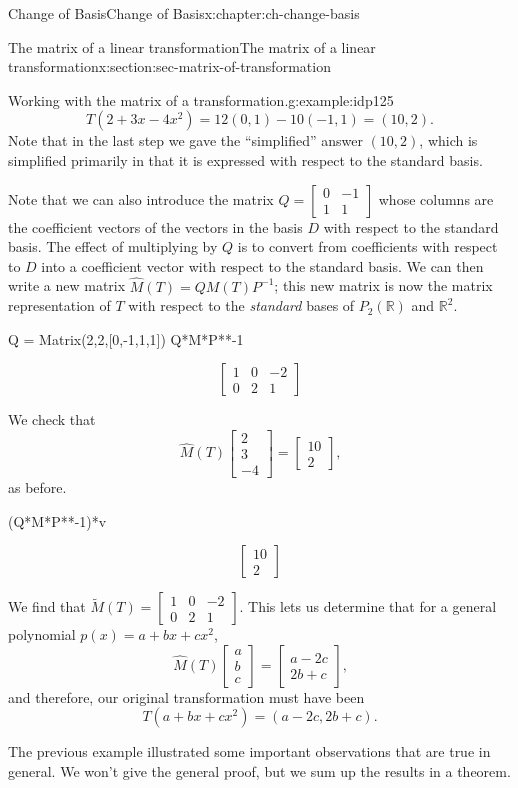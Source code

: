 \documentclass[oneside,10pt,]{book}
\numberwithin{equation}{section}
\newcommand{\bbm}{\begin{bmatrix}}
\newcommand{\ebm}{\end{bmatrix}}
\newcommand{\R}{\mathbb{R}}
\newcommand{\amp}{&}
\begin{document}
\begin{chapterptx}{Change of Basis}{}{Change of Basis}{}{}{x:chapter:ch-change-basis}
\begin{sectionptx}{The matrix of a linear transformation}{}{The matrix of a linear transformation}{}{}{x:section:sec-matrix-of-transformation}
\begin{example}{Working with the matrix of a transformation.}{g:example:idp125}
\begin{equation*}
T(2+3x-4x^2) = 12(0,1)-10(-1,1) = (10,2)\text{.}
\end{equation*}
Note that in the last step we gave the ``simplified'' answer \((10,2)\), which is simplified primarily in that it is expressed with respect to the standard basis.%
\par
Note that we can also introduce the matrix \(Q = \bbm 0\amp -1\\1\amp 1\ebm\) whose columns are the coefficient vectors of the vectors in the basis \(D\) with respect to the standard basis. The effect of multiplying by \(Q\) is to convert from coefficients with respect to \(D\) into a coefficient vector with respect to the standard basis. We can then write a new matrix \(\hat{M}(T) = QM(T)P^{-1}\); this new matrix is now the matrix representation of \(T\) with respect to the \emph{standard} bases of \(P_2(\R)\) and \(\R^2\).%
\begin{sageinput}
Q = Matrix(2,2,[0,-1,1,1])
Q*M*P**-1
\end{sageinput}
\begin{sageoutput}
\[\bbm 1\amp 0\amp -2\\0\amp 2\amp 1\ebm\]
\end{sageoutput}
We check that%
\begin{equation*}
\hat{M}(T)\bbm 2\\3\\-4\ebm = \bbm 10\\2\ebm\text{,}
\end{equation*}
as before.%
\begin{sageinput}
(Q*M*P**-1)*v
\end{sageinput}
\begin{sageoutput}
\[\bbm 10\\2 \ebm\]
\end{sageoutput}
We find that \(\tilde{M}(T) = \bbm 1\amp 0\amp -2\\0\amp 2\amp 1\ebm\). This lets us determine that for a general polynomial \(p(x) = a+bx+cx^2\),%
\begin{equation*}
\hat{M}(T)\bbm a\\b\\c\ebm = \bbm a-2c\\2b+c\ebm\text{,}
\end{equation*}
and therefore, our original transformation must have been%
\begin{equation*}
T(a+bx+cx^2)=(a-2c,2b+c)\text{.}
\end{equation*}
%
\end{example}
The previous example illustrated some important observations that are true in general. We won't give the general proof, but we sum up the results in a theorem.%

\end{sectionptx}
\end{chapterptx}
\end{document}
